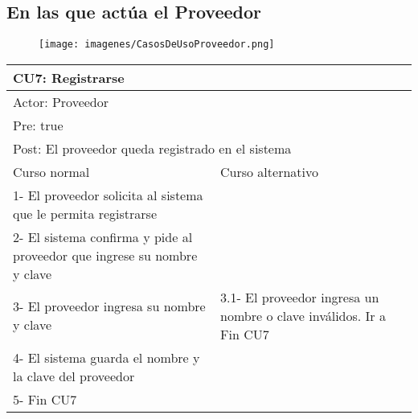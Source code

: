 \subsection{En las que actúa el Proveedor}

\begin{figure}[H]
    \texttt{[image: imagenes/CasosDeUsoProveedor.png]}
\end{figure}

\begin{table}[H]
  \begin{adjustbox}{max width = \textwidth}
  \begin{tabular}{|l|l|}
    \hline
    \multicolumn{2}{|l|}{CU7: Registrarse} \\\hline
    \multicolumn{2}{|l|}{Actor: Proveedor} \\\hline
    \multicolumn{2}{|l|}{Pre: true} \\\hline
    \multicolumn{2}{|l|}{Post: El proveedor queda registrado en el sistema} \\\hline
     Curso normal & Curso alternativo\\ \hline
     1- El proveedor solicita al sistema que le permita registrarse & \\ \hline
     2- El sistema confirma y pide al proveedor que ingrese su nombre y clave & \\ \hline
     3- El proveedor ingresa su nombre y clave & 3.1- El proveedor ingresa un nombre o clave inválidos. Ir a Fin CU7\\ \hline
     4- El sistema guarda el nombre y la clave del proveedor & \\ \hline
     5- Fin CU7 & \\ \hline
  \end{tabular}
  \end{adjustbox}
\end{table}

